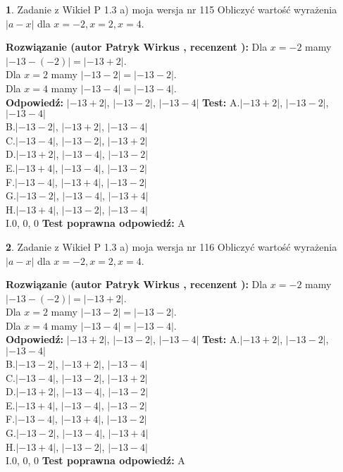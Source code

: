 \documentclass[12pt, a4paper]{article}
\theoremstyle{definition} %
\newtheorem{zad}{}
\newcommand{\zadStart}[1]{\begin{zad}#1\newline}
\newcommand{\zadStop}{\end{zad}}
\newcommand{\rozwStart}[2]{\noindent \textbf{Rozwiązanie (autor #1 , recenzent #2): }\newline}
\newcommand{\rozwStop}{\newline}
\newcommand{\odpStart}{\noindent \textbf{Odpowiedź:}\newline}
\newcommand{\odpStop}{\newline}
\newcommand{\testStart}{\noindent \textbf{Test:}\newline}
\newcommand{\testStop}{\newline}
\newcommand{\kluczStart}{\noindent \textbf{Test poprawna odpowiedź:}\newline}
\newcommand{\kluczStop}{\newline}
\begin{document}
\zadStart{Zadanie z Wikieł P 1.3 a) moja wersja nr 115}
Obliczyć wartość wyrażenia $|a - x|$ dla $x=-2,x=2,x=4$.
\zadStop
\rozwStart{Patryk Wirkus}{}
Dla $x = -2$ mamy $|-13 - (-2)| = |-13 + 2|$.\\
Dla $x = 2$ mamy $|-13 - 2| = |-13 - 2|$.\\
Dla $x = 4$ mamy $|-13 - 4| = |-13 - 4|$.\\
\rozwStop
\odpStart
$|-13 + 2|$, $|-13 - 2|$, $|-13 - 4|$
\odpStop
\testStart
A.$|-13 + 2|$, $|-13 - 2|$, $|-13 - 4|$\\
B.$|-13 - 2|$, $|-13 + 2|$, $|-13 - 4|$\\
C.$|-13 - 4|$, $|-13 - 2|$, $|-13 + 2|$\\
D.$|-13 + 2|$, $|-13 - 4|$, $|-13 - 2|$\\
E.$|-13 + 4|$, $|-13 - 4|$, $|-13 - 2|$\\
F.$|-13 - 4|$, $|-13 + 4|$, $|-13 - 2|$\\
G.$|-13 - 2|$, $|-13 - 4|$, $|-13 + 4|$\\
H.$|-13 + 4|$, $|-13 - 2|$, $|-13 - 4|$\\
I.$0$, $0$, $0$
\testStop
\kluczStart
A
\kluczStop



\zadStart{Zadanie z Wikieł P 1.3 a) moja wersja nr 116}
Obliczyć wartość wyrażenia $|a - x|$ dla $x=-2,x=2,x=4$.
\zadStop
\rozwStart{Patryk Wirkus}{}
Dla $x = -2$ mamy $|-13 - (-2)| = |-13 + 2|$.\\
Dla $x = 2$ mamy $|-13 - 2| = |-13 - 2|$.\\
Dla $x = 4$ mamy $|-13 - 4| = |-13 - 4|$.\\
\rozwStop
\odpStart
$|-13 + 2|$, $|-13 - 2|$, $|-13 - 4|$
\odpStop
\testStart
A.$|-13 + 2|$, $|-13 - 2|$, $|-13 - 4|$\\
B.$|-13 - 2|$, $|-13 + 2|$, $|-13 - 4|$\\
C.$|-13 - 4|$, $|-13 - 2|$, $|-13 + 2|$\\
D.$|-13 + 2|$, $|-13 - 4|$, $|-13 - 2|$\\
E.$|-13 + 4|$, $|-13 - 4|$, $|-13 - 2|$\\
F.$|-13 - 4|$, $|-13 + 4|$, $|-13 - 2|$\\
G.$|-13 - 2|$, $|-13 - 4|$, $|-13 + 4|$\\
H.$|-13 + 4|$, $|-13 - 2|$, $|-13 - 4|$\\
I.$0$, $0$, $0$
\testStop
\kluczStart
A
\kluczStop
\end{document}
